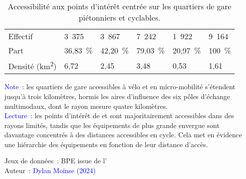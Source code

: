 \begin{table}[h!]
{\begin{tabular}{p{}p{}p{}p{}p{}p{}}
\small{Effectif} & \small{3~375} & \small{3~867} & \small{7~242} & \small{1~922} & \small{9~164}\\
\small{Part} & \small{36,83~\%} & \small{42,20~\%} & \small{79,03~\%} & \small{20,97~\%} & \small{100~\%}\\
\small{Densité (km\textsuperscript{2})} & \small{6,72} & \small{2,45} & \small{3,48} &	\small{0,53} & \small{1,61}\\
        \hline
        \end{tabular}}
    \caption{Accessibilité aux points d'intérêt centrée sur les quartiers de gare piétonniers et cyclables.}
    \label{table-chap5:accessibilite-poi}
        \vspace{5pt}
        \begin{flushleft}\scriptsize{
        \textcolor{blue}{Note~:} les quartiers de gare accessibles à vélo et en micro-mobilité s'étendent jusqu'à trois kilomètres, hormis les aires d'influence des six pôles d'échange multimodaux, dont le rayon mesure quatre kilomètres.
        \\
        \textcolor{blue}{Lecture~:} les points d'intérêt de  et  sont majoritairement accessibles dans des rayons limités, tandis que les équipements de plus grande envergue sont davantage concentrés à des distances accessibles en cycle. Cela met en évidence une hiérarchie des équipements en fonction de leur distance d'accès.
        }\end{flushleft}
        \begin{flushright}\scriptsize
        Jeux de données~: \acrfull{BPE} issue de l'\textcolor{blue}{\textcite{insee_base_2021}}
        \\
        Auteur~: \textcolor{blue}{Dylan Moinse (2024)}
        \end{flushright}
        \end{table}